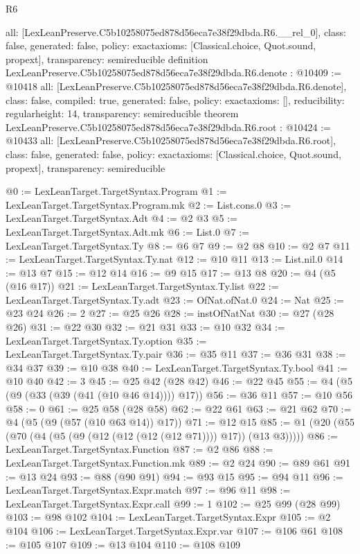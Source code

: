 \begin{lexlean}{R6}
\begin{coremodule}
{  all: [LexLeanPreserve.C5b10258075ed878d56eca7e38f29dbda.R6.__rel_0],
  class: false,
  generated: false,
  policy: exact{axioms: [Classical.choice, Quot.sound, propext]},
  transparency: semireducible
}
definition LexLeanPreserve.C5b10258075ed878d56eca7e38f29dbda.R6.denote : @10409 := @10418 {
  all: [LexLeanPreserve.C5b10258075ed878d56eca7e38f29dbda.R6.denote],
  class: false,
  compiled: true,
  generated: false,
  policy: exact{axioms: []},
  reducibility: regular{height: 14},
  transparency: semireducible
}
theorem LexLeanPreserve.C5b10258075ed878d56eca7e38f29dbda.R6.root : @10424 := @10433 {
  all: [LexLeanPreserve.C5b10258075ed878d56eca7e38f29dbda.R6.root],
  class: false,
  generated: false,
  policy: exact{axioms: [Classical.choice, Quot.sound, propext]},
  transparency: semireducible
}

@0 := LexLeanTarget.TargetSyntax.Program
@1 := LexLeanTarget.TargetSyntax.Program.mk
@2 := List.cons.{0}
@3 := LexLeanTarget.TargetSyntax.Adt
@4 := @2 @3
@5 := LexLeanTarget.TargetSyntax.Adt.mk
@6 := List.{0}
@7 := LexLeanTarget.TargetSyntax.Ty
@8 := @6 @7
@9 := @2 @8
@10 := @2 @7
@11 := LexLeanTarget.TargetSyntax.Ty.nat
@12 := @10 @11
@13 := List.nil.{0}
@14 := @13 @7
@15 := @12 @14
@16 := @9 @15
@17 := @13 @8
@20 := @4 (@5 (@16 @17))
@21 := LexLeanTarget.TargetSyntax.Ty.list
@22 := LexLeanTarget.TargetSyntax.Ty.adt
@23 := OfNat.ofNat.{0}
@24 := Nat
@25 := @23 @24
@26 := 2
@27 := @25 @26
@28 := instOfNatNat
@30 := @27 (@28 @26)
@31 := @22 @30
@32 := @21 @31
@33 := @10 @32
@34 := LexLeanTarget.TargetSyntax.Ty.option
@35 := LexLeanTarget.TargetSyntax.Ty.pair
@36 := @35 @11
@37 := @36 @31
@38 := @34 @37
@39 := @10 @38
@40 := LexLeanTarget.TargetSyntax.Ty.bool
@41 := @10 @40
@42 := 3
@45 := @25 @42 (@28 @42)
@46 := @22 @45
@55 := @4 (@5 (@9 (@33 (@39 (@41 (@10 @46 @14)))) @17))
@56 := @36 @11
@57 := @10 @56
@58 := 0
@61 := @25 @58 (@28 @58)
@62 := @22 @61
@63 := @21 @62
@70 := @4 (@5 (@9 (@57 (@10 @63 @14)) @17))
@71 := @12 @15
@85 := @1 (@20 (@55 (@70 (@4 (@5 (@9 (@12 (@12 (@12 (@12 @71)))) @17)) (@13 @3)))))
@86 := LexLeanTarget.TargetSyntax.Function
@87 := @2 @86
@88 := LexLeanTarget.TargetSyntax.Function.mk
@89 := @2 @24
@90 := @89 @61
@91 := @13 @24
@93 := @88 (@90 @91)
@94 := @93 @15
@95 := @94 @11
@96 := LexLeanTarget.TargetSyntax.Expr.match
@97 := @96 @11
@98 := LexLeanTarget.TargetSyntax.Expr.call
@99 := 1
@102 := @25 @99 (@28 @99)
@103 := @98 @102
@104 := LexLeanTarget.TargetSyntax.Expr
@105 := @2 @104
@106 := LexLeanTarget.TargetSyntax.Expr.var
@107 := @106 @61
@108 := @105 @107
@109 := @13 @104
@110 := @108 @109

\end{coremodule}
\end{lexlean}
